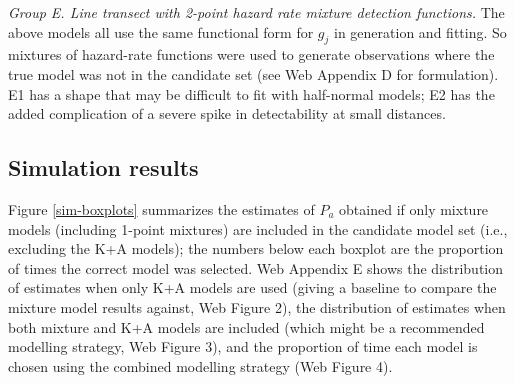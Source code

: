 \documentclass[useAMS,referee,usenatbib]{biom}
\begin{document}
\textit{Group E. Line transect with 2-point hazard rate mixture detection functions.} The above models all use the same functional form for $g_j$ in generation and fitting. So mixtures of hazard-rate functions were used to generate observations where the true model was not in the candidate set (see Web Appendix D for formulation). E1 has a shape that may be difficult to fit with half-normal models; E2 has the added complication of a severe spike in detectability at small distances.
  
\subsection{Simulation results}
\label{s:sims_res}

Figure \ref{sim-boxplots} summarizes the estimates of $P_a$ obtained if only mixture models (including 1-point mixtures) are included in the candidate model set (i.e., excluding the K+A models); the numbers below each boxplot are the proportion of times the correct model was selected.  Web Appendix E shows the distribution of estimates when only K+A models are used (giving a baseline to compare the mixture model results against, Web Figure 2), the distribution of estimates when both mixture and K+A models are included (which might be a recommended modelling strategy, Web Figure 3), and the proportion of time each model is chosen using the combined modelling strategy (Web Figure 4).
\end{document}
